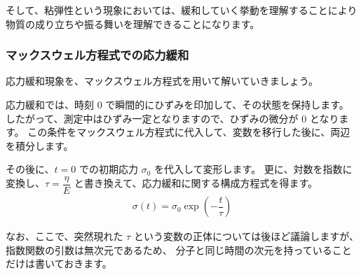 \documentclass[uplatex,dvipdfmx,a4paper,11pt]{jsarticle}
\begin{document}
そして、粘弾性という現象においては、緩和していく挙動を理解することにより物質の成り立ちや振る舞いを理解できることになります。


\subsubsection{マックスウェル方程式での応力緩和}
応力緩和現象を、マックスウェル方程式を用いて解いていきましょう。

応力緩和では、時刻 0 で瞬間的にひずみを印加して、その状態を保持します。
したがって、測定中はひずみ一定となりますので、ひずみの微分が 0 となります。
この条件をマックスウェル方程式に代入して、変数を移行した後に、両辺を積分します。

その後に、$t=0$ での初期応力 $\sigma_0$ を代入して変形します。
更に、対数を指数に変換し、$\tau = \dfrac{\eta}{E}$ と書き換えて、応力緩和に関する構成方程式を得ます。
\begin{align}
	\sigma(t) = \sigma_0 \exp \left(-\dfrac{t}{\tau} \right)
\end{align}

なお、ここで、突然現れた $\tau$ という変数の正体については後ほど議論しますが、指数関数の引数は無次元であるため、
分子と同じ時間の次元を持っていることだけは書いておきます。
\end{document}
